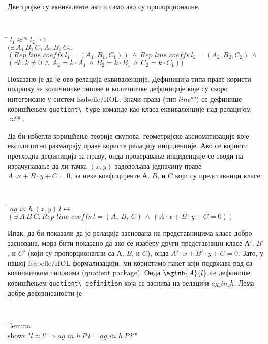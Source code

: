 Две тројке су еквиваленте ако и само ако су пропорционалне.
{\tt
\begin{tabbing}
\hspace{5mm}\=\kill
$l_1 \approx^{ag} l_2$ $\longleftrightarrow$ \\
\>  $(\exists\ A_1\,B_1\,C_1\,A_2\,B_2\,C_2.$\\
\>  $(\mathit{Rep\_line\_coeffs}\ l_1 = (A_1, B_1, C_1)) \ \wedge\ \mathit{Rep\_line\_coeffs}\ l_2 = (A_2, B_2, C_2)\ \wedge$\\
\>  $(\exists k.\ k \neq 0 \,\wedge\, A_2 = k\cdot A_1 \,\wedge\,  B_2 = k\cdot B_1\,\wedge\,C_2 = k\cdot C_1))$
\end{tabbing}
}
\noindent Показано је да је ово релација еквиваленције. Дефиниција
типа праве користи подршку за количничке типове и количничке
дефиниције које су скоро интегрисане у систем Isabelle/HOL. Значи
права (тип $\mathit{line^{ag}}$) се дефинише коришћењем
\verb|quotient\_type| команде као класа еквиваленције над релацијом
$\approx^{ag}$.

Да би избегли коришћење теорије скупова, геометријске аксиоматизације
које експлицитно разматрају праве користе релацију инциденције. Ако се
користи претходна дефиниција за праву, онда проверавање инциденције се
своди на израчунавање да ли тачка $(x, y)$ задовољава једначину праве
$A\cdot x + B\cdot y + C = 0$, за неке коефицијенте $А$, $B$, и $C$
који су представници класе.
{\tt
\begin{tabbing}
\hspace{5mm}\=\hspace{5mm}\=\kill
$ag\_in\_h\ (x, y)\ l \longleftrightarrow$\\
\>$(\exists\ A\ B\ C.\ \mathit{Rep\_line\_coeffs}\ l = (A,\ B,\ C) \,\wedge\,  (A\cdot x + B\cdot y + C = 0))$
\end{tabbing}
}

Ипак, да би показали да је релација заснована на представницима класе
добро заснована, мора бити показано да ако се изаберу други
представници класе $А'$, $B'$, и $C'$ (који су пропорционални са $А$,
$B$, и $C$), онда $A'\cdot x + B'\cdot y + C = 0$. Зато, у нашој
Isabelle/HOL формализацији, ми користимо пакет који подржава рад са
количничким типовима (quotient package). Онда $\aginh{A}{l}$ се
дефинише коришћењем \verb|quotient\_definition| која се заснива на
релацији $ag\_in\_h$. Лема добре дефинисаности је
{\tt
\begin{tabbing}
\hspace{5mm}\=\hspace{5mm}\=\kill
lemma \\
\>shows "$l \approx l' \Longrightarrow ag\_in\_h\ P\ l = ag\_in\_h\ P\ l'$"
\end{tabbing}
}


